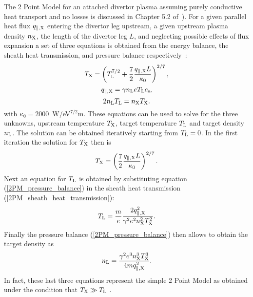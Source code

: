 \documentclass[amsmath,amssymb,a4]{revtex4}
\begin{document}
The 2 Point Model for an attached divertor plasma assuming purely conductive heat transport and no losses is discussed in Chapter 5.2 of~\cite{stangeby}). For a given parallel heat flux $q_{\parallel,\rm X}$ entering the divertor leg upstream, a given upstream plasma density $n_{\rm X}$, the length of the divertor leg $L$, and neglecting possible effects of flux expansion a set of three equations is obtained from the energy balance, the sheath heat transmission, and pressure balance respectively~\cite{stangeby}:
\begin{equation}\label{2PM_energy_balance}
    T_{\rm X} = \left(T_{\rm L}^{7/2} + {7 \over 2} {q_{\parallel,\rm X} L \over \kappa_0}\right)^{2/7},
\end{equation}
\begin{equation}\label{2PM_sheath_heat_transmission}
    q_{\parallel,\rm X} = \gamma n_{\rm L} e T_{\rm L} c_{\rm s},
\end{equation}
\begin{equation}\label{2PM_pressure_balance}
    2 n_{\rm L} T_{\rm L} = n_{\rm X} T_{\rm X}.
\end{equation}
with $\kappa_0 = 2000$~W/eV$^{7/2}$m. These equations can be used to solve for the three unknowns, upstream temperature $T_{\rm X}$, target temperature $T_{\rm L}$ and target density $n_{\rm L}$. The solution can be obtained iteratively starting from $T_{\rm L} = 0$. In the first iteration the solution for $T_{\rm X}$ then is
\begin{equation}\label{2PM_upstream_temperature}
    T_{\rm X} = \left({7 \over 2} {q_{\parallel,\rm X} L \over \kappa_0}\right)^{2/7}.
\end{equation}
Next an equation for $T_{\rm L}$ is obtained by substituting equation (\ref{2PM_pressure_balance}) in the sheath heat transmission (\ref{2PM_sheath_heat_transmission}):
\begin{equation}\label{2PM_target_temperature}
    T_{\rm L} = {m \over e} {2 q_{\parallel,\rm X}^2 \over \gamma^2 e^2 n_{\rm X}^2 T_{\rm X}^2}.
\end{equation}
Finally the pressure balance (\ref{2PM_pressure_balance}) then allows to obtain the target density as
\begin{equation}\label{2PM_target_density}
    n_{\rm L} = {\gamma^2 e^3 n_{\rm X}^3 T_{\rm X}^3 \over 4 m q_{\parallel,\rm X}^2}.
\end{equation}
In fact, these last three equations represent the simple 2 Point Model as obtained under the condition that $T_{\rm X} \gg T_{\rm L}$ \cite{stangeby}.
\end{document}
